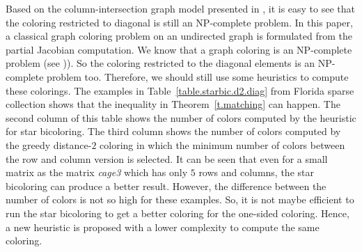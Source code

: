 \documentclass[12pt, twoside,a4paper,toc=bibliography]{scrbook}
\begin{document}
Based on the column-intersection graph model presented in \cite{cscpaper},
it is easy to see
that the coloring restricted to diagonal is still an NP-complete problem.
In this paper, a classical graph coloring problem on an undirected graph
is formulated from the partial Jacobian computation.
We know that a graph coloring is an NP-complete problem
(see \cite{np-complet-graph-coloring})).
So the coloring restricted to the diagonal elements is an NP-complete problem too.
Therefore, we should still use some heuristics to compute these colorings.
The examples in Table~\ref{table.starbic.d2.diag} from Florida sparse collection shows that the
inequality in Theorem~\ref{t.matching} can happen. The second column of this table
shows the number of colors computed by the heuristic for star bicoloring.
The third column shows the number of colors computed by the greedy distance-$2$ coloring
in which the minimum number of colors between the row and column version is selected.
It can be seen that even for a small matrix as the matrix \textit{cage3} which has only
$5$ rows and columns, the star bicoloring can produce a better result.
However, the difference between the number of colors is not so high for these examples.
So, it is not maybe efficient to run the star bicoloring to get a better coloring for
the one-sided coloring. Hence, a new heuristic is proposed with a lower complexity
to compute the same coloring.
\end{document}
